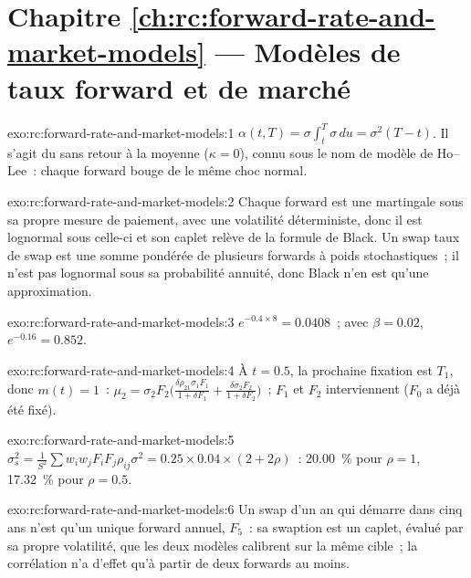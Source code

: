 \section*{Chapitre \ref{ch:rc:forward-rate-and-market-models} --- Modèles de taux forward et de marché}

\begin{solution}{exo:rc:forward-rate-and-market-models:1}
$\alpha(t,T) = \sigma\int_t^T\sigma\,du = \sigma^2(T-t)$. Il s'agit du  sans
retour à la moyenne ($\kappa=0$), connu sous le nom de modèle de Ho--Lee~: chaque forward bouge de
le même choc normal.
\end{solution}

\begin{solution}{exo:rc:forward-rate-and-market-models:2}
Chaque forward est une martingale sous sa propre mesure de paiement, avec une volatilité
déterministe, donc il est lognormal sous celle-ci et son caplet relève de la formule de Black. Un swap
taux de swap est une somme pondérée de plusieurs forwards à poids stochastiques~; il n'est pas
lognormal sous sa probabilité annuité, donc Black n'en est qu'une approximation.
\end{solution}

\begin{solution}{exo:rc:forward-rate-and-market-models:3}
$e^{-0.4\times8} = 0.0408$~; avec $\beta=0.02$, $e^{-0.16} = 0.852$.
\end{solution}

\begin{solution}{exo:rc:forward-rate-and-market-models:4}
À $t=0.5$, la prochaine fixation est $T_1$, donc $m(t)=1$~:
$\mu_2 = \sigma_2F_2\bigl(\frac{\delta\rho_{21}\sigma_1F_1}{1+\delta F_1}+\frac{\delta\sigma_2F_2}{1+\delta F_2}\bigr)$~;
$F_1$ et $F_2$ interviennent ($F_0$ a déjà été fixé).
\end{solution}

\begin{solution}{exo:rc:forward-rate-and-market-models:5}
$\sigma_s^2 = \frac{1}{S^2}\sum w_iw_jF_iF_j\rho_{ij}\sigma^2 = 0.25\times0.04\times(2+2\rho)$~:
20.00~\% pour $\rho=1$, 17.32~\% pour $\rho=0.5$.
\end{solution}

\begin{solution}{exo:rc:forward-rate-and-market-models:6}
Un swap d'un an qui démarre dans cinq ans n'est qu'un unique forward annuel, $F_5$~: sa
swaption est un caplet, évalué par sa propre volatilité, que les deux modèles calibrent
sur la même cible~; la corrélation n'a d'effet qu'à partir de deux forwards au moins.
\end{solution}

